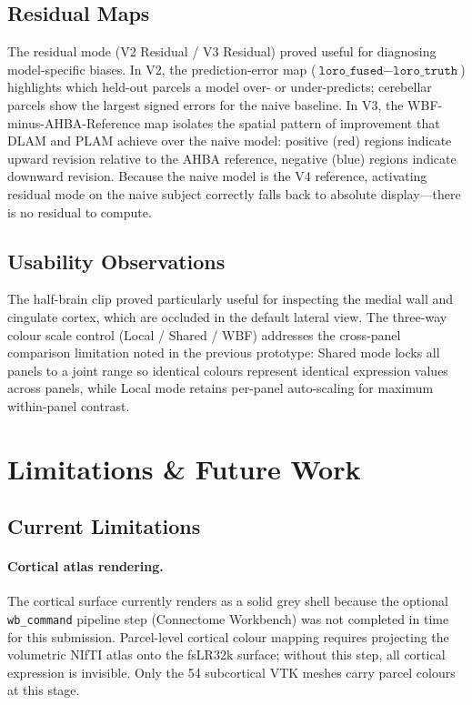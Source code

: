 \documentclass[11pt,letterpaper]{article}
\begin{document}
\subsection{Residual Maps}

The residual mode (V2 Residual / V3 Residual) proved useful for
diagnosing model-specific biases.
In V2, the prediction-error map ($\texttt{loro\_fused} - \texttt{loro\_truth}$)
highlights which held-out parcels a model over- or under-predicts;
cerebellar parcels show the largest signed errors for the naive baseline.
In V3, the WBF-minus-AHBA-Reference map isolates the spatial pattern of
improvement that DLAM and PLAM achieve over the naive model:
positive (red) regions indicate upward revision relative to the AHBA
reference, negative (blue) regions indicate downward revision.
Because the naive model is the V4 reference, activating residual mode on
the naive subject correctly falls back to absolute display—there is no
residual to compute.

\subsection{Usability Observations}

The half-brain clip proved particularly useful for inspecting the
medial wall and cingulate cortex, which are occluded in the default
lateral view.
The three-way colour scale control (Local / Shared / WBF) addresses the
cross-panel comparison limitation noted in the previous prototype:
Shared mode locks all panels to a joint range so identical colours
represent identical expression values across panels, while Local mode
retains per-panel auto-scaling for maximum within-panel contrast.

\section{Limitations \& Future Work}
\label{sec:limits}

\subsection{Current Limitations}

\paragraph{Cortical atlas rendering.}
The cortical surface currently renders as a solid grey shell because
the optional \texttt{wb\_command} pipeline step (Connectome Workbench)
was not completed in time for this submission.
Parcel-level cortical colour mapping requires projecting the volumetric
NIfTI atlas onto the fsLR32k surface; without this step, all cortical
expression is invisible.
Only the 54 subcortical VTK meshes carry parcel colours at this stage.
\end{document}
